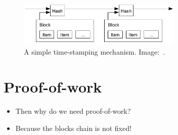 \begin{frame}
  \begin{figure}
    \includegraphics[width=0.7\textwidth]{fig/bitcoin-stamp.png}
    \caption{A simple time-stamping mechanism.
    Image:~\cite{Nakamoto2008bap}.}
  \end{figure}

  \vfill

\end{frame}


\section{Proof-of-work}

\begin{frame}
  \begin{question}
    \begin{itemize}
      \item Then why do we need proof-of-work?
    \end{itemize}
  \end{question}

  \begin{remark}
    \begin{itemize}
      \item Because the blocks chain is not fixed!
    \end{itemize}
  \end{remark}
\end{frame}

